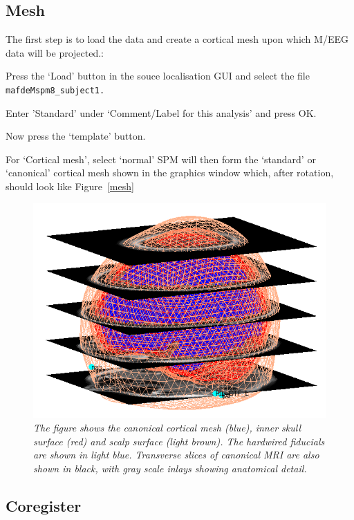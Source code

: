 \subsection{Mesh}
The first step is to load the data and create a cortical mesh upon which M/EEG data will be projected.:
\bi
\item{Press the `Load' button in the souce localisation GUI and select the file \texttt{mafdeMspm8\_subject1.}}
\item{Enter 'Standard' under `Comment/Label for this analysis' and press OK.}
\item{Now press the `template' button.}
\item{For `Cortical mesh', select `normal'}
\ei
SPM will then form the `standard' or `canonical' cortical mesh shown in the graphics window which, after rotation, should look like Figure~\ref{mesh}
\begin{figure}
\begin{center}
\includegraphics[width=120mm]{mmn/mesh}
\caption{\em The figure shows the canonical cortical mesh (blue), inner skull surface (red) and scalp surface (light brown). The hardwired fiducials are shown in light blue. Transverse slices of canonical MRI are also shown in black, with gray scale inlays showing anatomical detail.
}
\end{center}
\end{figure}

\subsection{Coregister}

